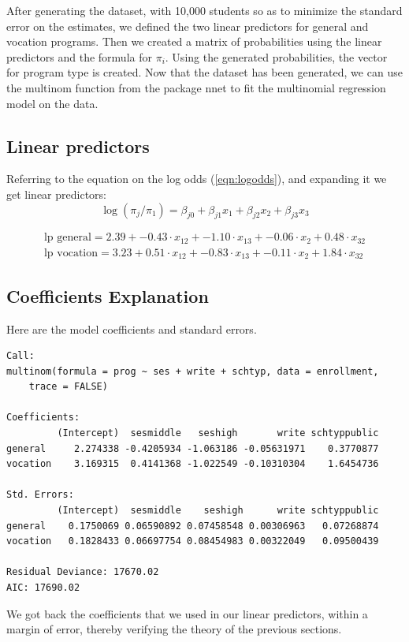 \documentclass[12pt]{article}
\begin{document}
After generating the dataset, with 10,000 students so as to minimize the standard error on the estimates, we defined the two linear predictors for general and vocation programs. Then we created a matrix of probabilities using the linear predictors and the formula for $\pi_i$. Using the generated probabilities, the vector for program type is created. Now that the dataset has been generated, we can use the multinom function from the package nnet to fit the multinomial regression model on the data.

\subsection{Linear predictors}
Referring to the equation on the log odds (\ref{eqn:logodds}), and expanding it we get linear predictors:
\[\log(\pi_j/\pi_1) = \beta_{j0} + \beta_{j1}x_{1} + \beta_{j2}x_2 + \beta_{j3}x_{3}\]

\begin{eqnarray*}
\text{lp general} = 2.39 + -0.43 \cdot x_{12} + -1.10 \cdot x_{13} + -0.06 \cdot x_2 + 0.48 \cdot x_{32} \\
\text{lp vocation} = 3.23 + 0.51 \cdot x_{12} + -0.83 \cdot x_{13} + -0.11 \cdot x_{2} + 1.84 \cdot x_{32}
\end{eqnarray*}

\subsection{Coefficients Explanation}
Here are the model coefficients and standard errors.
\begin{Verbatim}[fontsize=\small]
Call:
multinom(formula = prog ~ ses + write + schtyp, data = enrollment, 
    trace = FALSE)

Coefficients:
         (Intercept)  sesmiddle   seshigh       write schtyppublic
general     2.274338 -0.4205934 -1.063186 -0.05631971    0.3770877
vocation    3.169315  0.4141368 -1.022549 -0.10310304    1.6454736

Std. Errors:
         (Intercept)  sesmiddle    seshigh      write schtyppublic
general    0.1750069 0.06590892 0.07458548 0.00306963   0.07268874
vocation   0.1828433 0.06697754 0.08454983 0.00322049   0.09500439

Residual Deviance: 17670.02 
AIC: 17690.02 
\end{Verbatim}

We got back the coefficients that we used in our linear predictors, within a margin of error, thereby verifying the theory of the previous sections. 
\end{document}
